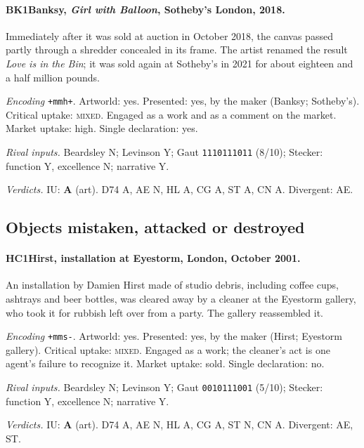 \paragraph{BK1\enspace Banksy, \emph{Girl with Balloon}, Sotheby's London, 2018.}
Immediately after it was sold at auction in October 2018, the canvas passed partly through a shredder concealed in its frame. The artist renamed the result \emph{Love is in the Bin}; it was sold again at Sotheby's in 2021 for about eighteen and a half million pounds.\par
\noindent\textit{Encoding} \texttt{+mmh+}. Artworld: yes. Presented: yes, by the maker (Banksy; Sotheby's). Critical uptake: \textsc{mixed}. Engaged as a work and as a comment on the market. Market uptake: high. Single declaration: yes.\par
\noindent\textit{Rival inputs.} Beardsley N; Levinson Y; Gaut \texttt{1110111011} (8/10); Stecker: function Y, excellence N; narrative Y.\par
\noindent\textit{Verdicts.} IU: \textbf{A} (art). D74 A, AE N, HL A, CG A, ST A, CN A. Divergent: AE.\par

\subsection{Objects mistaken, attacked or destroyed}

\paragraph{HC1\enspace Hirst, installation at Eyestorm, London, October 2001.}
An installation by Damien Hirst made of studio debris, including coffee cups, ashtrays and beer bottles, was cleared away by a cleaner at the Eyestorm gallery, who took it for rubbish left over from a party. The gallery reassembled it.\par
\noindent\textit{Encoding} \texttt{+mms-}. Artworld: yes. Presented: yes, by the maker (Hirst; Eyestorm gallery). Critical uptake: \textsc{mixed}. Engaged as a work; the cleaner's act is one agent's failure to recognize it. Market uptake: sold. Single declaration: no.\par
\noindent\textit{Rival inputs.} Beardsley N; Levinson Y; Gaut \texttt{0010111001} (5/10); Stecker: function Y, excellence N; narrative Y.\par
\noindent\textit{Verdicts.} IU: \textbf{A} (art). D74 A, AE N, HL A, CG A, ST N, CN A. Divergent: AE, ST.\par

